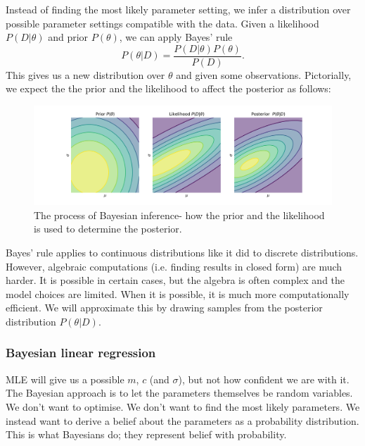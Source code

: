 \documentclass[a4paper, openany]{memoir}
\begin{document}
Instead of finding the most likely parameter setting, we infer a distribution over possible parameter settings compatible with the data. Given a likelihood $P(D|\theta)$ and prior $P(\theta)$, we can apply Bayes' rule
\[P(\theta|D) = \frac{P(D|\theta) P(\theta)}{P(D)}.\]
This gives us a new distribution over $\theta$ and given some observations. Pictorially, we expect the the prior and the likelihood to affect the posterior as follows:
\begin{figure}[H]
    \centering
    \includegraphics[scale=0.38]{src/5.29 bayesian_inference.png}
    \caption{The process of Bayesian inference- how the prior and the likelihood is used to determine the posterior.}
\end{figure}

Bayes' rule applies to continuous distributions like it did to discrete distributions. However, algebraic computations (i.e. finding results in closed form) are much harder. It is possible in certain cases, but the algebra is often complex and the model choices are limited. When it is possible, it is much more computationally efficient. We will approximate this by drawing samples from the posterior distribution $P(\theta|D)$.

\subsubsection{Bayesian linear regression}
MLE will give us a possible $m$, $c$ (and $\sigma$), but not how confident we are with it. The Bayesian approach is to let the parameters themselves be random variables. We don't want to optimise. We don't want to find the most likely parameters. We instead want to derive a belief about the parameters as a probability distribution. This is what Bayesians do; they represent belief with probability.
\end{document}
